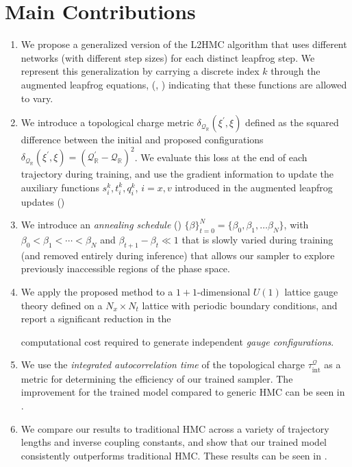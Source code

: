 \documentclass{article} %
\begin{document}
\section{\label{sec:main_contributions}Main Contributions}
\begin{enumerate}
   \item We propose a generalized version of the L2HMC algorithm that uses different networks (with different step
      sizes) for each distinct leapfrog step.
      We represent this generalization by carrying a discrete index \(k\) through the augmented leapfrog equations,
      (, ) indicating that these functions are allowed to
      vary.
   \item We introduce a topological charge metric \(\delta_{\mathcal{Q}_{\mathbb{R}}}(\xi^{\prime}, \xi)\) defined as
      the squared difference between the initial and proposed configurations
      \(\delta_{\mathcal{Q}_{\mathbb{R}}}(\xi^{\prime}, \xi) = {\left(\mathcal{Q}_{\mathbb{R}}^{\prime} -
      \mathcal{Q}_{\mathbb{R}}\right)}^{2}\).
      We evaluate this loss at the end of each trajectory during training, and use the gradient information to update
      the auxiliary functions \(s^{k}_{i}, t^{k}_{i}, q^{k}_{i}\), \(i = x, v\) introduced in the augmented leapfrog
      updates ()
   \item We introduce an \emph{annealing schedule} () \({\{\beta\}}_{t=0}^{N} =
      \{\beta_{0}, \beta_{1}, \ldots \beta_{N}\}\), with \(\beta_{0} < \beta_{1} < \cdots < \beta_{N}\) and
      \(\beta_{t+1} - \beta_{t} \ll 1\) that is slowly varied during training (and removed entirely during inference)
      that allows our sampler to explore previously inaccessible regions of the phase space.
   \item We apply the proposed method to a \(1+1\)-dimensional \(U(1)\) lattice gauge theory defined on a
      \(N_{x}\times N_{t}\) lattice with periodic boundary conditions, and report a significant reduction in the

      computational cost required to generate independent \emph{gauge configurations}.
   \item We use the \emph{integrated autocorrelation time} of the topological charge
      \(\tau_{\mathrm{int}}^{\mathcal{Q}}\) as a metric for determining the efficiency of our trained sampler.
      The improvement for the trained model compared to generic HMC can be seen in .
   \item We compare our results to traditional HMC across a variety of trajectory lengths and inverse coupling
      constants, and show that our trained model consistently outperforms traditional HMC.\@
      These results can be seen in .
\end{enumerate}
%
\end{document}
